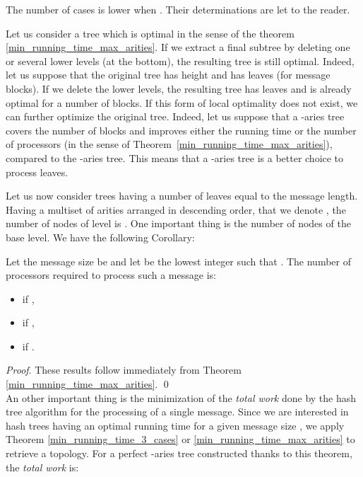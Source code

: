 \documentclass{llncs}
\renewenvironment{proof}{\paragraph{Proof} }{\hfill\qed}
\renewcommand{\paragraph}[1]{\noindent\textit{#1}.}
\begin{document}
\begin{remark}
The number of cases is lower when . Their determinations are let to the reader.
\end{remark}

\begin{remark}\label{local_optimality_rem}
Let us consider a tree which is optimal in the sense of the theorem \ref{min_running_time_max_arities}. If we extract a final subtree by deleting 
one or several lower levels (at the bottom), the resulting tree is still optimal. Indeed, let us suppose
that the original tree has height  and has  leaves (for  message blocks). If we delete the  lower levels, the resulting tree 
has  leaves and is already optimal for a number  of blocks.
If this form of local optimality does not exist, we can further optimize the original tree. Indeed, let us suppose that a -aries 
tree covers the number of blocks  and improves either the running time or the number of processors (in the sense of Theorem~\ref{min_running_time_max_arities}), 
compared to the -aries tree. This means that a -aries tree is a better choice 
to process  leaves.
\end{remark}

Let us now consider trees having a number of leaves equal to the message length. 
Having a multiset of arities arranged in descending order, that we denote \break ,
the number of nodes of level  is . One important thing is the number of nodes 
of the base level. We have the following Corollary:


\begin{corollary}\label{numb_proc}
Let the message size be  and let  be the lowest integer such that . 
The number of processors required to process
such a message is:
\begin{itemize}
 \item  if ,
 \item  if ,
 
 
 \item  if .
\end{itemize}

\end{corollary}

\begin{proof}
These results follow immediately from Theorem \ref{min_running_time_max_arities}.
\end{proof}
~\\





An other important thing is the minimization of the \textit{total work} done by the hash tree algorithm for the processing of a single message. 
Since we are interested in hash trees having an optimal running time for a given message size , 
we apply Theorem \ref{min_running_time_3_cases} or \ref{min_running_time_max_arities} to retrieve a topology.
For a perfect -aries tree constructed thanks to this theorem, the \textit{total work} is:
\end{document}
